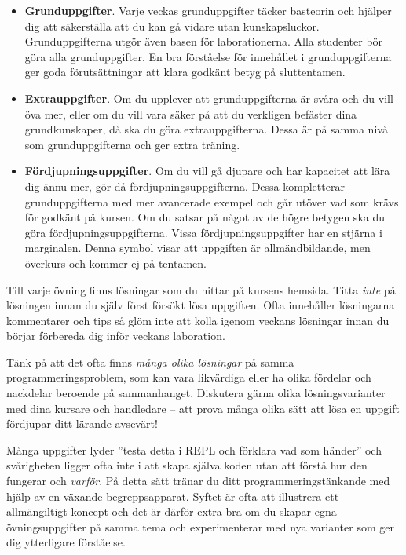 \begin{itemize}
\item \textbf{Grunduppgifter}. Varje veckas grunduppgifter täcker basteorin och hjälper dig att säkerställa att du kan gå vidare utan kunskapsluckor. Grunduppgifterna utgör även basen för laborationerna. Alla studenter bör göra alla grunduppgifter. En bra förståelse för innehållet i grunduppgifterna ger goda förutsättningar att klara godkänt betyg på sluttentamen.

\item \textbf{Extrauppgifter}. Om du upplever att grunduppgifterna är svåra och du vill öva mer, eller om du vill vara säker på att du verkligen befäster dina grundkunskaper, då ska du göra extrauppgifterna. Dessa är på samma nivå som grunduppgifterna och ger extra träning.

\item \textbf{Fördjupningsuppgifter}. Om du vill gå djupare och har kapacitet att lära dig ännu mer, gör då fördjupningsuppgifterna. Dessa kompletterar grunduppgifterna med mer avancerade exempel och går utöver vad som krävs för godkänt på kursen. Om du satsar på något av de högre betygen ska du göra fördjupningsuppgifterna.
\Uberkurs Vissa fördjupningsuppgifter har en stjärna i marginalen. Denna symbol visar att uppgiften är allmändbildande, men överkurs och kommer ej på tentamen.

\end{itemize}


Till varje övning finns lösningar som du hittar på kursens hemsida. Titta \emph{inte} på lösningen innan du själv först försökt lösa uppgiften. Ofta innehåller lösningarna kommentarer och tips så glöm inte att kolla igenom veckans lösningar innan du börjar förbereda dig inför veckans  laboration.

Tänk på att det ofta finns \emph{många olika lösningar} på samma programmeringsproblem, som kan vara likvärdiga eller ha olika fördelar och nackdelar beroende på sammanhanget. Diskutera gärna olika lösningsvarianter med dina kursare och handledare -- att prova många olika sätt att lösa en uppgift fördjupar ditt lärande avsevärt!

Många uppgifter lyder ''testa detta i REPL och förklara vad som händer'' och svårigheten ligger ofta inte i att skapa själva koden utan att förstå hur den fungerar och \emph{varför}. På detta sätt tränar du ditt programmeringstänkande med hjälp av en växande begreppsapparat. Syftet är ofta att illustrera ett allmängiltigt koncept och det är därför extra bra om du skapar egna övningsuppgifter på samma tema och experimenterar med nya varianter som ger dig ytterligare förståelse.

